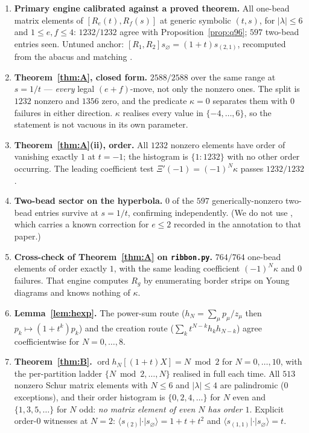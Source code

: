 \documentclass[11pt]{article}
\theoremstyle{definition}
\newcommand{\ord}{\operatorname{ord}}
\begin{document}
\begin{enumerate}
\item \textbf{Primary engine calibrated against a proved theorem.}  All one-bead matrix
elements of $[R_e(t),R_f(s)]$ at generic symbolic $(t,s)$, for $|\lambda|\le6$ and
$1\le e,f\le4$: $1232/1232$ agree with Proposition~\ref{prop:q96}; $597$ two-bead entries
seen.  Untuned anchor: $[R_1,R_2]s_\varnothing=(1+t)s_{(2,1)}$, recomputed from the abacus
and matching \cite[\S3]{Q92}.

\item \textbf{Theorem~\ref{thm:A}, closed form.}  $2588/2588$ over the same range at
$s=1/t$ --- \emph{every} legal $(e{+}f)$-move, not only the nonzero ones.  The split is
$1232$ nonzero and $1356$ zero, and the predicate $\kappa=0$ separates them with $0$
failures in either direction.  $\kappa$ realises every value in $\{-4,\dots,6\}$, so the
statement is not vacuous in its own parameter.

\item \textbf{Theorem~\ref{thm:A}(ii), order.}  All $1232$ nonzero elements have order of
vanishing exactly $1$ at $t=-1$; the histogram is $\{1:1232\}$ with no other order
occurring.  The leading coefficient test $\Xi'(-1)=(-1)^{N}\kappa$ passes $1232/1232$.

\item \textbf{Two-bead sector on the hyperbola.}  $0$ of the $597$ generically-nonzero
two-bead entries survive at $s=1/t$, confirming \cite[Cor.~4.2(iii)]{Q96} independently.
(We do not use \cite[Cor.~4.2(iv)]{Q96}, which carries a known correction for $e\le2$
recorded in the annotation to that paper.)

\item \textbf{Cross-check of Theorem~\ref{thm:A} on \texttt{ribbon.py}.}  $764/764$ one-bead
elements of order exactly $1$, with the same leading coefficient $(-1)^{N}\kappa$ and $0$
failures.  That engine computes $R_g$ by enumerating border strips on Young diagrams and
knows nothing of $\kappa$.

\item \textbf{Lemma~\ref{lem:hexp}.}  The power-sum route
($h_N=\sum_{\mu}p_\mu/z_\mu$ then $p_k\mapsto(1+t^k)p_k$) and the creation route
($\sum_k t^{N-k}h_kh_{N-k}$) agree coefficientwise for $N=0,\dots,8$.

\item \textbf{Theorem~\ref{thm:B}.}  $\ord h_N[(1+t)X]=N\bmod2$ for $N=0,\dots,10$, with the
per-partition ladder $\{N\bmod2,\dots,N\}$ realised in full each time.  All $513$ nonzero
Schur matrix elements with $N\le6$ and $|\lambda|\le4$ are palindromic ($0$ exceptions), and
their order histogram is $\{0,2,4,\dots\}$ for $N$ even and $\{1,3,5,\dots\}$ for $N$ odd:
\emph{no matrix element of even $N$ has order $1$}.  Explicit order-$0$ witnesses at $N=2$:
$\langle s_{(2)}|\cdot|s_\varnothing\rangle=1+t+t^{2}$ and
$\langle s_{(1,1)}|\cdot|s_\varnothing\rangle=t$.


\end{enumerate}
\end{document}
